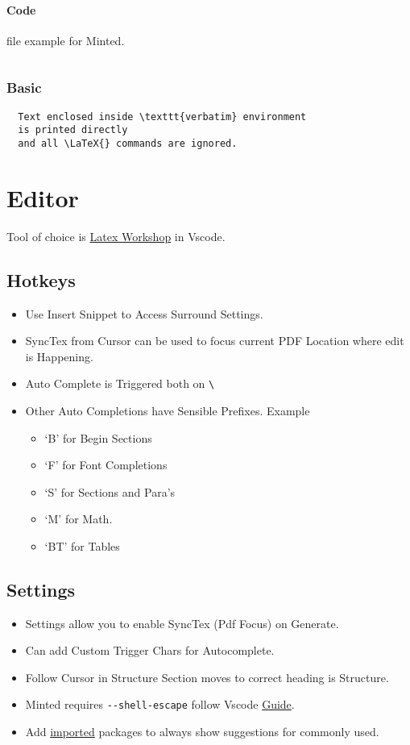 \documentclass{report}[a4paper,12pt] %
\begin{document}
\paragraph{Code} file example for Minted.
\inputminted{tex}{../../presentation/beamer/tutorial.tex} 

\subsubsection{Basic}
\begin{verbatim}
  Text enclosed inside \texttt{verbatim} environment 
  is printed directly 
  and all \LaTeX{} commands are ignored.
\end{verbatim}

\section{Editor}
Tool of choice is \href{https://github.com/James-Yu/LaTeX-Workshop}{Latex Workshop} in Vscode.
\subsection{Hotkeys}
\begin{itemize}
  \item Use Insert Snippet to Access Surround Settings.
  \item SyncTex from Cursor can be used to focus current PDF Location where edit is Happening.
  \item Auto Complete is Triggered both on \verb|\|
  \item Other Auto Completions have Sensible Prefixes. Example
  \begin{itemize}
    \item `B' for Begin Sections
    \item `F' for Font Completions
    \item `S' for Sections and Para's
    \item `M' for Math.
    \item `BT' for Tables
  \end{itemize}
\end{itemize}

\subsection{Settings}
\begin{itemize}
  \item Settings allow you to enable SyncTex (Pdf Focus) on Generate.
  \item Can add Custom Trigger Chars for Autocomplete.
  \item Follow Cursor in Structure Section moves to correct heading is Structure.
  \item Minted requires \verb|--shell-escape| follow Vscode \href{https://leportella.com/minted-vscode/}{Guide}.
  \item Add \href{https://www.reddit.com/r/LaTeX/comments/pwkopy/subfile_autocompletion_in_vs_code/}{imported} packages to always show suggestions for commonly used.
\end{itemize}
\end{document}
